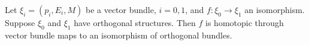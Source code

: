 Let $\xi_i = (p_i, E_i, M)$ be a vector bundle, $i = 0, 1$, and $f: \xi_0 \to \xi_1$ an isomorphism. Suppose $\xi_0$ and $\xi_1$ have orthogonal structures. Then $f$ is homotopic through vector bundle maps to an isomorphism of orthogonal bundles.

